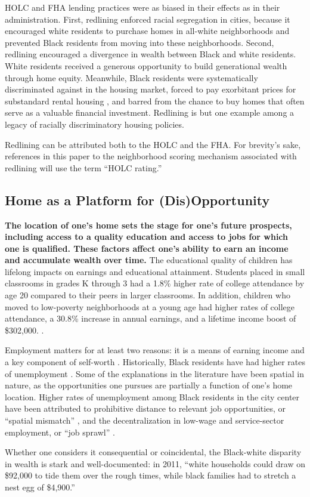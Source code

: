 \documentclass[paper=letter, fontsize=12pt]{scrartcl} %
\begin{document}
	HOLC and FHA lending practices were as biased in their effects as in their administration. First, redlining enforced racial segregation in cities, because it encouraged white residents to purchase homes in all-white neighborhoods and prevented Black residents from moving into these neighborhoods. Second, redlining encouraged a divergence in wealth between Black and white residents. White residents received a generous opportunity to build generational wealth through home equity. Meanwhile, Black residents were systematically discriminated against in the housing market, forced to pay exorbitant prices for substandard rental housing \cite{orfield}, and barred from the chance to buy homes that often serve as a valuable financial investment. Redlining is but one example among a legacy of racially discriminatory housing policies.\par
	
	Redlining can be attributed both to the HOLC and the FHA. For brevity's sake, references in this paper to the neighborhood scoring mechanism associated with redlining will use the term ``HOLC rating.''
	
	\subsection{Home as a Platform for (Dis)Opportunity}
	\textbf{The location of one's home sets the stage for one's future prospects, including access to a quality education and access to jobs for which one is qualified. These factors affect one's ability to earn an income and accumulate wealth over time.} The educational quality of children has lifelong impacts on earnings and educational attainment. Students placed in small classrooms in grades K through 3 had a 1.8\% higher rate of college attendance by age 20 compared to their peers in larger classrooms. \cite{chetty2} In addition, children who moved to low-poverty neighborhoods at a young age had higher rates of college attendance, a 30.8\% increase in annual earnings, and a lifetime income boost of \$302,000. \cite{chetty}.\par
	Employment matters for at least two reasons: it is a means of earning income and a key component of self-worth \cite{blair}. Historically, Black residents have had higher rates of unemployment \cite{wilson}. Some of the explanations in the literature have been spatial in nature, as the opportunities one pursues are partially a function of one's home location. Higher rates of unemployment among Black residents in the city center have been attributed to prohibitive distance to relevant job opportunities, or ``spatial mismatch'' \cite{kain1},  and the decentralization in low-wage and service-sector employment, or ``job sprawl'' \cite{briggs}.\par
	Whether one considers it consequential or coincidental, the Black-white disparity in wealth is stark and well-documented: in 2011, ``white households could draw on \$92,000 to tide them over the rough times, while black families had to stretch a nest egg of \$4,900.'' \cite{goldfield}\par
	
\end{document}
